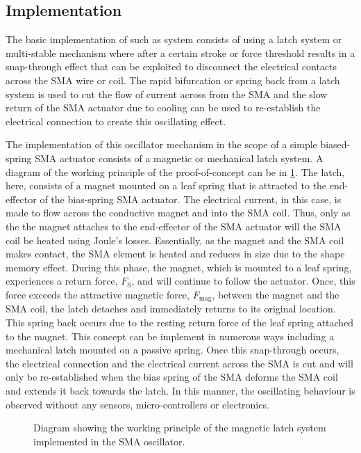 \subsection{Implementation}\label{sec:magnetic-latch}
The basic implementation of such as system consists of using a latch system or multi-stable mechanism where after a certain stroke or force threshold results in a snap-through effect that can be exploited to disconnect the electrical contacts across the SMA wire or coil. The rapid bifurcation or spring back from a latch system is used to cut the flow of current across from the SMA and the slow return of the SMA actuator due to cooling can be used to re-establish the electrical connection to create this oscillating effect.

The implementation of this oscillator mechanism in the scope of a simple biased-spring SMA actuator consists of a magnetic or mechanical latch system. A diagram of the working principle of the proof-of-concept can be in \cref{fig:oscillator-schematic}. The latch, here, consists of a magnet mounted on a leaf spring that is attracted to the end-effector of the bias-spring SMA actuator. The electrical current, in this case, is made to flow across the conductive magnet and into the SMA coil. Thus, only as the the magnet attaches to the end-effector of the SMA actuator will the SMA coil be heated using Joule's losses. Essentially, as the magnet and the SMA coil makes contact, the SMA element is heated and reduces in size due to the shape memory effect. During this phase, the magnet, which is mounted to a leaf spring, experiences a return force, $F_\textrm{S}$, and will continue to follow the actuator. Once, this force exceeds the attractive magnetic force, $F_\textrm{mag}$, between the magnet and the SMA coil, the latch detaches and immediately returns to its original location. This spring back occurs due to the resting return force of the leaf spring attached to the magnet. This concept can be implement in numerous ways including a mechanical latch mounted on a passive spring. Once this snap-through occurs, the electrical connection and the electrical current across the SMA is cut and will only be re-established when the bias spring of the SMA deforms the SMA coil and extends it back towards the latch. In this manner, the oscillating behaviour is observed without any sensors, micro-controllers or electronics.


\begin{figure}[ht] %
  \centering
  \resizebox{0.6\textwidth}{!}{}
  \caption{Diagram showing the working principle of the magnetic latch system implemented in the SMA oscillator.}
  \label{fig:oscillator-schematic}
\end{figure}


